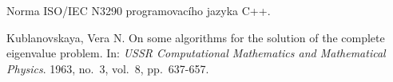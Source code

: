\documentclass[11pt,a4paper]{article}
\newcommand{\cpp}{\textsc{C++}}
\begin{document}
\pagebreak

\begin{thebibliography}{9}

Norma \textsc{ISO/IEC N3290} programovacího jazyka \cpp.

  {\sc Kublanovskaya}, Vera N.
  On some algorithms for the solution of the complete eigenvalue problem.
  In: \emph{USSR Computational Mathematics and Mathematical Physics\/}.
  1963,
  no.~3,
  vol.~8,
  pp.~637-657.

\end{thebibliography}
\end{document}
